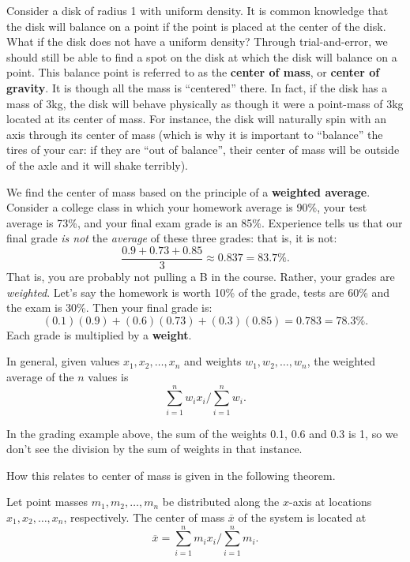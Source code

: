 Consider a disk of radius 1 with uniform density. It is common knowledge that the disk will balance on a point if the point is placed at the center of the disk. What if the disk does not have a uniform density? Through trial-and-error, we should still be able to find a spot on the disk at which the disk will balance on a point. This balance point is referred to as the \textbf{center of mass}, or \textbf{center of gravity}. It is though all the mass is ``centered'' there. In fact, if the disk has a mass of 3kg, the disk will behave physically as though it were a point-mass of 3kg located at its center of mass. For instance, the disk will naturally spin with an axis through its center of mass (which is why it is important to ``balance'' the tires of your car: if they are ``out of balance'', their center of mass will be outside of the axle and it will shake terribly).

We find the center of mass based on the principle of a \textbf{weighted average}. Consider a college class in which your homework average is 90\%, your test average is 73\%, and your final exam grade is an 85\%. Experience tells us that our final grade \textit{is not} the \textit{average} of these three grades: that is, it is not:
$$\frac{0.9+0.73+0.85}{3} \approx 0.837 = 83.7\text{\%}.$$
That is, you are probably not pulling a B in the course. Rather, your grades are \textit{weighted}. Let's say the homework is worth 10\% of the grade, tests are 60\% and the exam is 30\%. Then your final grade is:
$$(0.1)(0.9) + (0.6)(0.73)+(0.3)(0.85) = 0.783 = 78.3\text{\%}.$$
Each grade is multiplied by a \textbf{weight}. 

In general, given values $x_1,x_2,\ldots,x_n$ and weights $w_1,w_2,\ldots,w_n$, the weighted average of the $n$ values is
$$\sum_{i=1}^n w_ix_i\Bigg/\sum_{i=1}^n w_i.$$

In the grading example above, the sum of the weights 0.1, 0.6 and 0.3 is 1, so we don't see the division by the sum of weights in that instance.

How this relates to center of mass is given in the following theorem.

{Let point masses $m_1,m_2,\ldots,m_n$ be distributed along the $x$-axis at locations $x_1,x_2,\ldots,x_n$, respectively. The center of mass $\overline{x}$ of the system is located at
$$\overline{x} = \sum_{i=1}^nm_ix_i\Bigg/\sum_{i=1}^n m_i.$$}

